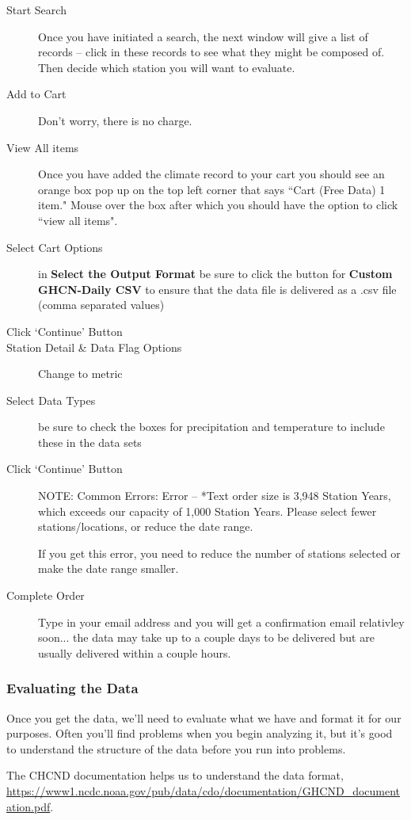 \documentclass{article}\usepackage[]{graphicx}\usepackage[]{color}
\begin{document}
\begin{description}
  \item[Start Search] Once you have initiated a search, the next window will give a list of records -- click in these records to see what they might be composed of. Then decide which station you will want to evaluate.
  \item[Add to Cart] Don't worry, there is no charge. 
  \item[View All items] Once you have added the climate record to your cart you should see an orange box pop up on the top left corner that says ``Cart (Free Data) 1 item." Mouse over the box after which you should have the option to click ``view all items".
  \item[Select Cart Options] in \textbf{Select the Output Format} be sure to click the button for \textbf{Custom GHCN-Daily CSV} to ensure that the data file is delivered as a .csv file (comma separated values)
  \item[Click `Continue' Button]
  \item[Station Detail \& Data Flag Options] Change to metric
  \item[Select Data Types] be sure to check the boxes for precipitation and temperature to include these in the data sets
  \item[Click `Continue' Button] NOTE: Common Errors:
Error -- *Text order size is 3,948 Station Years, which exceeds our capacity of 1,000 Station Years. Please select fewer stations/locations, or reduce the date range.

If you get this error, you need to reduce the number of stations selected or make the date range smaller.
  
  \item[Complete Order] Type in your email address and you will get a confirmation email relativley soon... the data may take up to a couple days to be delivered but are usually delivered within a couple hours.
\end{description}


\subsubsection{Evaluating the Data}

Once you get the data, we'll need to evaluate what we have and format it for our purposes. Often you'll find problems when you begin analyzing it, but it's good to understand the structure of the data before you run into problems. 

The CHCND documentation helps us to understand the data format, \url{https://www1.ncdc.noaa.gov/pub/data/cdo/documentation/GHCND_documentation.pdf}.
\end{document}
